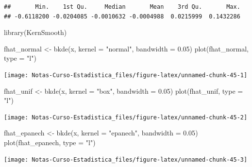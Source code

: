 \documentclass[
  12pt,
]{book}
\newenvironment{Shaded}{\begin{snugshade}}{\end{snugshade}}
\newcommand{\AttributeTok}[1]{\textcolor[rgb]{0.77,0.63,0.00}{#1}}
\newcommand{\FloatTok}[1]{\textcolor[rgb]{0.00,0.00,0.81}{#1}}
\newcommand{\FunctionTok}[1]{\textcolor[rgb]{0.00,0.00,0.00}{#1}}
\newcommand{\NormalTok}[1]{#1}
\newcommand{\OtherTok}[1]{\textcolor[rgb]{0.56,0.35,0.01}{#1}}
\newcommand{\StringTok}[1]{\textcolor[rgb]{0.31,0.60,0.02}{#1}}
\begin{document}
\begin{verbatim}
##       Min.    1st Qu.     Median       Mean    3rd Qu.       Max. 
## -0.6118200 -0.0204085 -0.0010632 -0.0004988  0.0215999  0.1432286
\end{verbatim}

\begin{Shaded}
\begin{Highlighting}[]
\FunctionTok{library}\NormalTok{(KernSmooth)}

\NormalTok{fhat\_normal }\OtherTok{\textless{}{-}} \FunctionTok{bkde}\NormalTok{(x, }\AttributeTok{kernel =} \StringTok{"normal"}\NormalTok{, }\AttributeTok{bandwidth =} \FloatTok{0.05}\NormalTok{)}
\FunctionTok{plot}\NormalTok{(fhat\_normal, }\AttributeTok{type =} \StringTok{"l"}\NormalTok{)}
\end{Highlighting}
\end{Shaded}

\begin{center}\texttt{[image: Notas-Curso-Estadistica\_files/figure-latex/unnamed-chunk-45-1]} \end{center}

\begin{Shaded}
\begin{Highlighting}[]
\NormalTok{fhat\_unif }\OtherTok{\textless{}{-}} \FunctionTok{bkde}\NormalTok{(x, }\AttributeTok{kernel =} \StringTok{"box"}\NormalTok{, }\AttributeTok{bandwidth =} \FloatTok{0.05}\NormalTok{)}
\FunctionTok{plot}\NormalTok{(fhat\_unif, }\AttributeTok{type =} \StringTok{"l"}\NormalTok{)}
\end{Highlighting}
\end{Shaded}

\begin{center}\texttt{[image: Notas-Curso-Estadistica\_files/figure-latex/unnamed-chunk-45-2]} \end{center}

\begin{Shaded}
\begin{Highlighting}[]
\NormalTok{fhat\_epanech }\OtherTok{\textless{}{-}} \FunctionTok{bkde}\NormalTok{(x, }\AttributeTok{kernel =} \StringTok{"epanech"}\NormalTok{, }\AttributeTok{bandwidth =} \FloatTok{0.05}\NormalTok{)}
\FunctionTok{plot}\NormalTok{(fhat\_epanech, }\AttributeTok{type =} \StringTok{"l"}\NormalTok{)}
\end{Highlighting}
\end{Shaded}

\begin{center}\texttt{[image: Notas-Curso-Estadistica\_files/figure-latex/unnamed-chunk-45-3]} \end{center}
\end{document}

